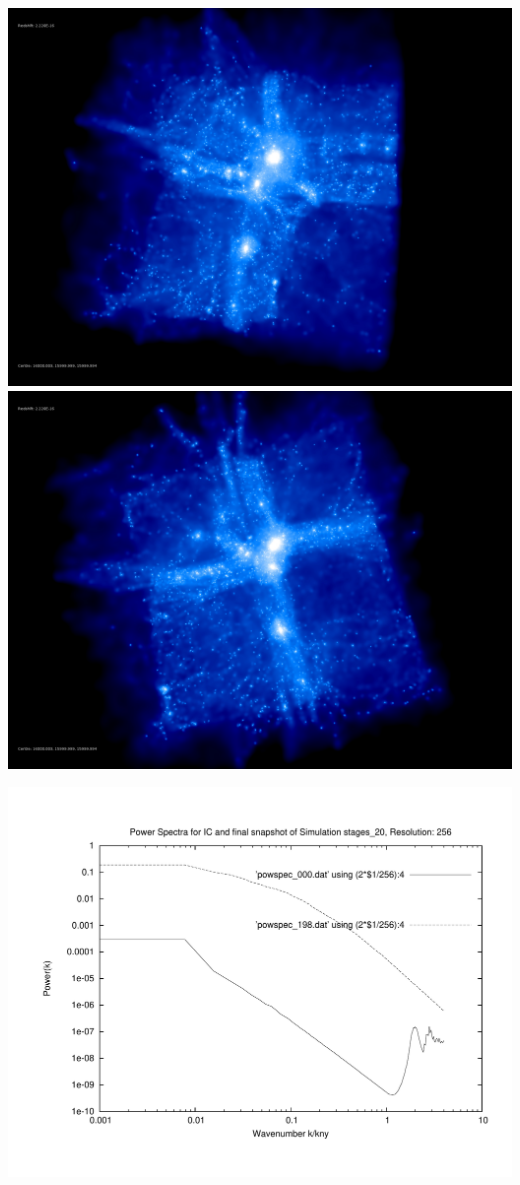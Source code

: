 \includegraphics[scale=0.1]{r256/stages_20/rotate_00074.jpg} 
\includegraphics[scale=0.1]{r256/stages_20/rotate_00131.jpg}

\includegraphics[scale=0.5]{r256/stages_20/plot_powspec_stages_20}

